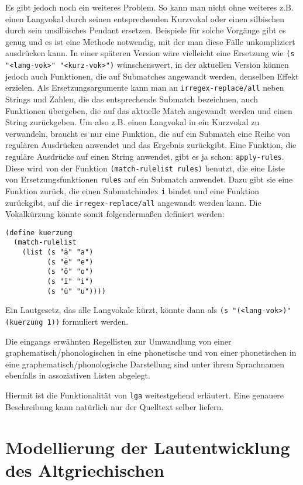 \documentclass[12pt,a4paper,normalheadings]{scrartcl}
\def\tt#1{\texttt{#1}}
\begin{document}
Es gibt jedoch noch ein weiteres Problem.
So kann man nicht ohne weiteres z.B. einen Langvokal durch seinen
entsprechenden Kurzvokal oder einen silbischen durch sein unsilbisches
Pendant ersetzen.
Beispiele für solche Vorgänge gibt es genug und es ist eine Methode notwendig,
mit der man diese Fälle unkompliziert ausdrücken kann.
In einer späteren Version wäre vielleicht eine Ersetzung wie
\tt{(s "<lang-vok>" "<kurz-vok>")} wünschenswert,
in der aktuellen Version können jedoch auch Funktionen,
die auf Submatches angewandt werden, denselben Effekt erzielen.
Als Ersetzungsargumente kann man an \tt{irregex-replace/all}
neben Strings und Zahlen, die das entsprechende Submatch bezeichnen,
auch Funktionen übergeben,
die auf das aktuelle Match angewandt werden und einen String zurückgeben.
Um also z.B. einen Langvokal in ein Kurzvokal zu verwandeln,
braucht es nur eine Funktion,
die auf ein Submatch eine Reihe von regulären Ausdrücken anwendet
und das Ergebnis zurückgibt.
Eine Funktion, die reguläre Ausdrücke auf einen String anwendet,
gibt es ja schon: \tt{apply-rules}.
Diese wird von der Funktion \tt{(match-rulelist rules)} benutzt,
die eine Liste von Ersetzungsfunktionen \tt{rules}
auf ein Submatch anwendet.
Dazu gibt sie eine Funktion zurück,
die einen Submatchindex \tt{i} bindet und eine Funktion zurückgibt,
auf die \tt{irregex-replace/all} angewandt werden kann.
Die Vokalkürzung könnte somit folgendermaßen definiert werden:
\begin{verbatim}
(define kuerzung
  (match-rulelist
    (list (s "ā" "a")
          (s "ē" "e")
          (s "ō" "o")
          (s "ī" "i")
          (s "ū" "u"))))
\end{verbatim}
Ein Lautgesetz, das alle Langvokale kürzt,
könnte dann als \tt{(s "(<lang-vok>)" (kuerzung 1))} formuliert werden.

Die eingangs erwähnten Regellisten zur Umwandlung von einer
graphematisch/phonologischen in eine phonetische und von
einer phonetischen in eine graphematisch/phonologische Darstellung
sind unter ihrem Sprachnamen ebenfalls in
assoziativen Listen abgelegt.

Hiermit ist die Funktionalität von \tt{lga} weitestgehend erläutert.
Eine genauere Beschreibung kann natürlich nur der Quelltext selber liefern.

\section{Modellierung der Lautentwicklung des Altgriechischen}
\end{document}

